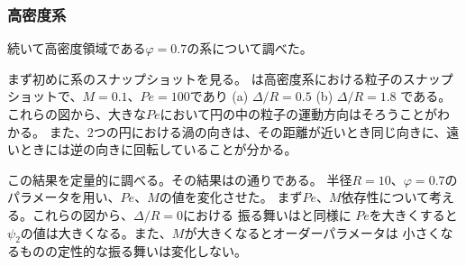 \documentclass[/Users/ikedahajime/GitHub/reserch/master_report/thesis]{subfiles}
\begin{document}
\subsubsection{高密度系}
続いて高密度領域である$\varphi=0.7$の系について調べた。

まず初めに系のスナップショットを見る。
は高密度系における粒子のスナップショットで、$M=0.1、Pe=100$であり
(a) $\Delta/R=0.5$ (b) $\Delta/R=1.8$ である。
これらの図から、大きな$Pe$において円の中の粒子の運動方向はそろうことがわかる。
また、2つの円における渦の向きは、その距離が近いとき同じ向きに、遠いときには逆の向きに回転していることが分かる。

この結果を定量的に調べる。その結果はの通りである。
半径$R=10$、$\varphi=0.7$のパラメータを用い、$Pe、M$の値を変化させた。
まず$Pe、M$依存性について考える。これらの図から、$\Delta/R=0$における
振る舞いはと同様に
$Pe$を大きくすると$\psi_2$の値は大きくなる。また、$M$が大きくなるとオーダーパラメータは
小さくなるものの定性的な振る舞いは変化しない。
\end{document}
